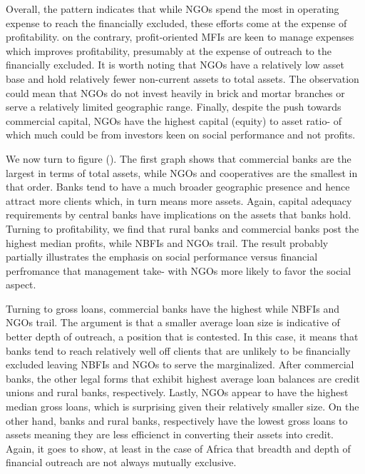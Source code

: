 \documentclass[
]{article}
\begin{document}
Overall, the pattern indicates that while NGOs spend the most in
operating expense to reach the financially excluded, these efforts come
at the expense of profitability. on the contrary, profit-oriented MFIs
are keen to manage expenses which improves profitability, presumably at
the expense of outreach to the financially excluded. It is worth noting
that NGOs have a relatively low asset base and hold relatively fewer
non-current assets to total assets. The observation could mean that NGOs
do not invest heavily in brick and mortar branches or serve a relatively
limited geographic range. Finally, despite the push towards commercial
capital, NGOs have the highest capital (equity) to asset ratio- of which
much could be from investors keen on social performance and not profits.

We now turn to figure (). The first graph shows that commercial banks
are the largest in terms of total assets, while NGOs and cooperatives
are the smallest in that order. Banks tend to have a much broader
geographic presence and hence attract more clients which, in turn means
more assets. Again, capital adequacy requirements by central banks have
implications on the assets that banks hold. Turning to profitability, we
find that rural banks and commercial banks post the highest median
profits, while NBFIs and NGOs trail. The result probably partially
illustrates the emphasis on social performance versus financial
perfromance that management take- with NGOs more likely to favor the
social aspect.

Turning to gross loans, commercial banks have the highest while NBFIs
and NGOs trail. The argument is that a smaller average loan size is
indicative of better depth of outreach, a position that is contested. In
this case, it means that banks tend to reach relatively well off clients
that are unlikely to be financially excluded leaving NBFIs and NGOs to
serve the marginalized. After commercial banks, the other legal forms
that exhibit highest average loan balances are credit unions and rural
banks, respectively. Lastly, NGOs appear to have the highest median
gross loans, which is surprising given their relatively smaller size. On
the other hand, banks and rural banks, respectively have the lowest
gross loans to assets meaning they are less efficienct in converting
their assets into credit. Again, it goes to show, at least in the case
of Africa that breadth and depth of financial outreach are not always
mutually exclusive.
\end{document}

